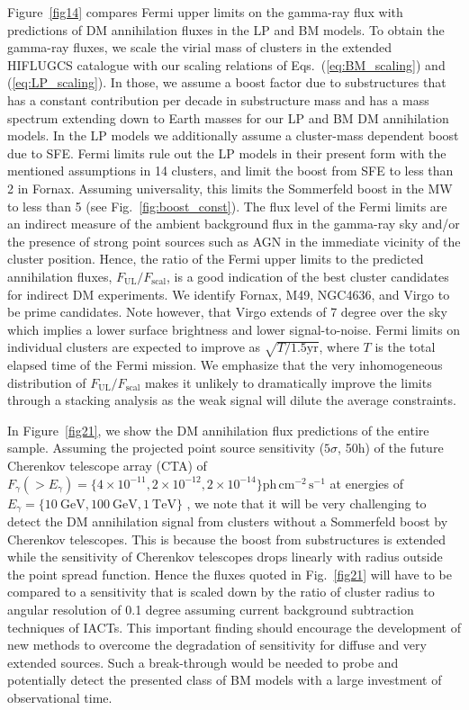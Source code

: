\documentclass[10pt,aps,pra,reprint,amsmath,amsfonts,amssymb,showpacs,nofootinbib,floatfix]{revtex4-1}
\newcommand{\rmn}{\mathrm}
\begin{document}
Figure~\ref{fig14} compares Fermi upper limits on the gamma-ray flux
with predictions of DM annihilation fluxes in the LP and BM models.
To obtain the gamma-ray fluxes, we scale the virial mass of clusters
in the extended HIFLUGCS catalogue \cite{2002ApJ...567..716R} with our
scaling relations of Eqs.~(\ref{eq:BM_scaling}) and
(\ref{eq:LP_scaling}). In those, we assume a boost factor due to
substructures that has a constant contribution per decade in
substructure mass and has a mass spectrum extending down to Earth
masses for our LP and BM DM annihilation models. In the LP models we
additionally assume a cluster-mass dependent boost due to SFE. Fermi
limits rule out the LP models in their present form with the mentioned
assumptions in 14 clusters, and limit the boost from SFE to less than
2 in Fornax. Assuming universality, this limits the Sommerfeld boost
in the MW to less than 5 (see Fig.~\ref{fig:boost_const}).  The flux
level of the Fermi limits are an indirect measure of the ambient
background flux in the gamma-ray sky and/or the presence of strong
point sources such as AGN in the immediate vicinity of the cluster
position. Hence, the ratio of the Fermi upper limits to the predicted
annihilation fluxes, $F_{\mathrm{UL}}/F_{\mathrm{scal}}$, is a good
indication of the best cluster candidates for indirect DM
experiments. We identify Fornax, M49, NGC4636, and Virgo to be prime
candidates. Note however, that Virgo extends of 7 degree over the sky
which implies a lower surface brightness and lower signal-to-noise.
Fermi limits on individual clusters are expected to improve as
$\sqrt{T/1.5 \mathrm{yr}}$, where $T$ is the total elapsed time of the
Fermi mission. We emphasize that the very inhomogeneous distribution
of $F_{\mathrm{UL}}/ F_{\mathrm{scal}}$ makes it unlikely to
dramatically improve the limits through a stacking analysis as the
weak signal will dilute the average constraints.

In Figure~\ref{fig21}, we show the DM annihilation flux predictions of
the entire sample.  Assuming the projected point source sensitivity
($5\sigma$, 50h) of the future Cherenkov telescope array (CTA) of
$F_\gamma(>E_\gamma) = \{4\times10^{-11}, 2\times10^{-12},
2\times10^{-14}\} \rmn{ph}\,\rmn{cm}^{-2}\,\rmn{s}^{-1}$ at energies
of $E_\gamma=\{10~\rmn{GeV}, 100~\rmn{GeV}, 1~\rmn{TeV}\}$
\cite{2009arXiv0908.1410D}, we note that it will be very challenging
to detect the DM annihilation signal from clusters without a
Sommerfeld boost by Cherenkov telescopes.  This is because the boost
from substructures is extended while the sensitivity of Cherenkov
telescopes drops linearly with radius outside the point spread
function. Hence the fluxes quoted in Fig.~\ref{fig21} will have to be
compared to a sensitivity that is scaled down by the ratio of cluster
radius to angular resolution of 0.1 degree assuming current background
subtraction techniques of IACTs.  This important finding should
encourage the development of new methods to overcome the degradation
of sensitivity for diffuse and very extended sources. Such a
break-through would be needed to probe and potentially detect the
presented class of BM models with a large investment of observational
time.
\end{document}
